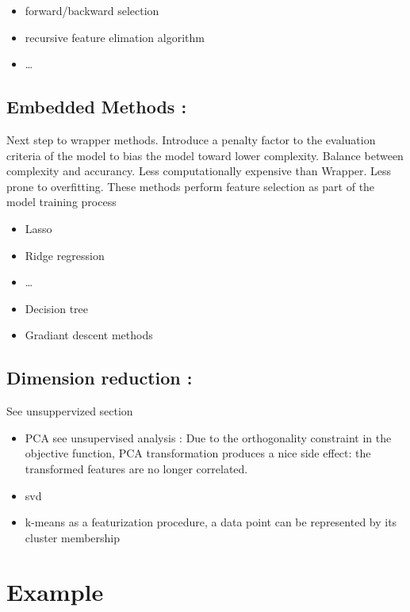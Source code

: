 \documentclass[]{book}
\providecommand{\tightlist}{%
  \setlength{\itemsep}{0pt}\setlength{\parskip}{0pt}}
\theoremstyle{definition}
\theoremstyle{definition}
\theoremstyle{definition}
\theoremstyle{remark}
\begin{document}
\begin{itemize}
\tightlist
\item
  forward/backward selection
\item
  recursive feature elimation algorithm
\item
  \ldots{}
\end{itemize}

\subsection{Embedded Methods :}\label{embedded-methods}

Next step to wrapper methods. Introduce a penalty factor to the
evaluation criteria of the model to bias the model toward lower
complexity. Balance between complexity and accurancy. Less
computationally expensive than Wrapper. Less prone to overfitting. These
methods perform feature selection as part of the model training process

\begin{itemize}
\tightlist
\item
  Lasso
\item
  Ridge regression
\item
  \ldots{}
\item
  Decision tree
\item
  Gradiant descent methods
\end{itemize}

\subsection{Dimension reduction :}\label{dimension-reduction}

See unsuppervized section

\begin{itemize}
\tightlist
\item
  PCA see unsupervised analysis : Due to the orthogonality constraint in
  the objective function, PCA transformation produces a nice side
  effect: the transformed features are no longer correlated.
\item
  svd
\item
  k-means as a featurization procedure, a data point can be represented
  by its cluster membership
\end{itemize}

\section{Example}\label{example}
\end{document}
